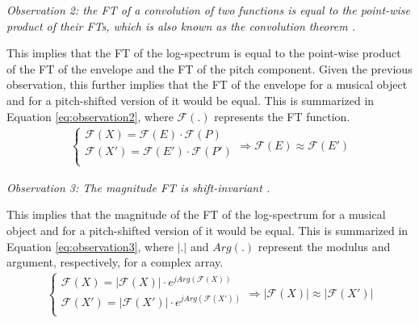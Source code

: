 \documentclass[journal]{IEEEtran}
\begin{document}
\emph{Observation 2: the FT of a convolution of two functions is equal to the point-wise product of their FTs, which is also known as the convolution theorem \cite{proakis1995}.}

This implies that the FT of the log-spectrum is equal to the point-wise product of the FT of the envelope and the FT of the pitch component. Given the previous observation, this further implies that the FT of the envelope for a musical object and for a pitch-shifted version of it would be equal. This is summarized in Equation \ref{eq:observation2}, where $\mathcal{F}(.)$ represents the FT function.
\begin{equation}
\label{eq:observation2}
\begin{split}
\begin{cases}
\mathcal{F}(X) = \mathcal{F}(E) \cdot \mathcal{F}(P) \\
\mathcal{F}(X') = \mathcal{F}(E') \cdot \mathcal{F}(P') \\
\end{cases}
\Rightarrow \mathcal{F}(E) \approx \mathcal{F}(E')
\end{split}
\end{equation}

\emph{Observation 3: The magnitude FT is shift-invariant \cite{proakis1995}.}

This implies that the magnitude of the FT of the log-spectrum for a musical object and for a pitch-shifted version of it would be equal. This is summarized in Equation \ref{eq:observation3}, where $|.|$ and $Arg(.)$ represent the modulus and argument, respectively, for a complex array. 
\begin{equation}
\label{eq:observation3}
\begin{split}
\begin{cases}
\mathcal{F}(X) = |\mathcal{F}(X)| \cdot e^{j Arg(\mathcal{F}(X))} \\
\mathcal{F}(X') = |\mathcal{F}(X')| \cdot e^{j Arg(\mathcal{F}(X'))} \\
\end{cases}
\Rightarrow |\mathcal{F}(X)| \approx |\mathcal{F}(X')|
\end{split}
\end{equation}
\end{document}
